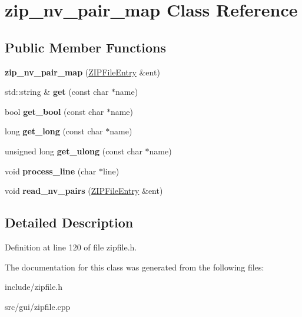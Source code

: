 \hypertarget{classzip__nv__pair__map}{\section{zip\-\_\-nv\-\_\-pair\-\_\-map Class Reference}
\label{classzip__nv__pair__map}
}
\subsection*{Public Member Functions}
\begin{DoxyCompactItemize}
\item 
\hypertarget{classzip__nv__pair__map_a39ee7d9da9d46f2da253810badc531b2}{{\bfseries zip\-\_\-nv\-\_\-pair\-\_\-map} (\hyperlink{classZIPFileEntry}{Z\-I\-P\-File\-Entry} \&ent)}\label{classzip__nv__pair__map_a39ee7d9da9d46f2da253810badc531b2}

\item 
\hypertarget{classzip__nv__pair__map_a562f0aa12b7e3e3012853961bc2a4f07}{std\-::string \& {\bfseries get} (const char $\ast$name)}\label{classzip__nv__pair__map_a562f0aa12b7e3e3012853961bc2a4f07}

\item 
\hypertarget{classzip__nv__pair__map_a2e3e2f3fd7cd8445354c7b8f49e59b49}{bool {\bfseries get\-\_\-bool} (const char $\ast$name)}\label{classzip__nv__pair__map_a2e3e2f3fd7cd8445354c7b8f49e59b49}

\item 
\hypertarget{classzip__nv__pair__map_a69ca193f09e134e946abdeaea6441783}{long {\bfseries get\-\_\-long} (const char $\ast$name)}\label{classzip__nv__pair__map_a69ca193f09e134e946abdeaea6441783}

\item 
\hypertarget{classzip__nv__pair__map_a8c52b6342d8991b6878f839e4d091941}{unsigned long {\bfseries get\-\_\-ulong} (const char $\ast$name)}\label{classzip__nv__pair__map_a8c52b6342d8991b6878f839e4d091941}

\item 
\hypertarget{classzip__nv__pair__map_a243bf0d6cd6997c7abdce7ada4d35b8f}{void {\bfseries process\-\_\-line} (char $\ast$line)}\label{classzip__nv__pair__map_a243bf0d6cd6997c7abdce7ada4d35b8f}

\item 
\hypertarget{classzip__nv__pair__map_a7ef7e761115a6e02a6bfb88e1cb8fc73}{void {\bfseries read\-\_\-nv\-\_\-pairs} (\hyperlink{classZIPFileEntry}{Z\-I\-P\-File\-Entry} \&ent)}\label{classzip__nv__pair__map_a7ef7e761115a6e02a6bfb88e1cb8fc73}

\end{DoxyCompactItemize}


\subsection{Detailed Description}


Definition at line 120 of file zipfile.\-h.



The documentation for this class was generated from the following files\-:\begin{DoxyCompactItemize}
\item 
include/zipfile.\-h\item 
src/gui/zipfile.\-cpp\end{DoxyCompactItemize}
